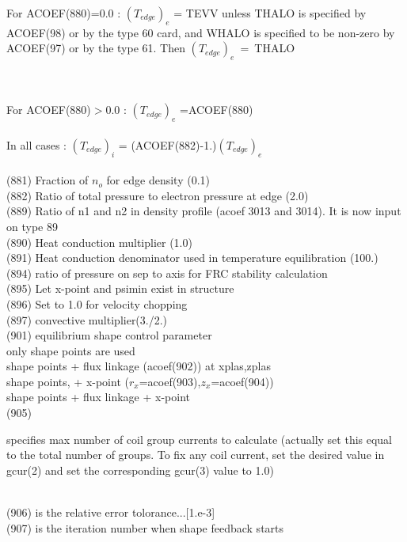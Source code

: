 \begin{tabbing}
 \>\parbox[t]{\width}{For ACOEF(880)=0.0  :  $\left({T_{edge}}\right)_e$ = TEVV  unless THALO  is  
specified  by ACOEF(98) or by the type 60  card, and WHALO is specified to be non-zero by ACOEF(97) 
or by the type 61.  Then $\left({T_{edge}}\right)_e$~=~THALO}  \\
  \\
  \>For ACOEF(880)$>$0.0 :  $\left({T_{edge}}\right)_e$ =ACOEF(880) \\
  \\
  \>In all cases  : $\left({T_{edge}}\right)_i$ = (ACOEF(882)-1.)$\left({T_{edge}}\right)_e$\\
 \\  
(881) \> Fraction of $n_o$ for edge density (0.1)\\
(882) \> Ratio of total pressure to electron pressure at edge (2.0)\\
(889) \> Ratio of n1 and n2 in density profile (acoef 3013 and 3014). It is now input on type 89 \\
(890) \> Heat conduction multiplier (1.0)\\
(891) \> Heat conduction denominator used in temperature equilibration (100.)\\
(894) \> ratio of pressure on sep to axis for FRC stability calculation \\
(895) \> Let x-point and psimin exist in structure \\
(896) \> Set to 1.0 for velocity chopping \\
(897) \> convective multiplier(3./2.) \\
(901) \> equilibrium shape control parameter  \\
        \> only shape points are used  \\
        \> shape points + flux linkage (acoef(902)) at xplas,zplas  \\
        \> shape points, + x-point ($r_x$=acoef(903),$z_x$=acoef(904))  \\
        \>  shape points + flux linkage + x-point   \\
(905) \>  \parbox[t]{\width}{ specifies max number of coil group currents to calculate
(actually set this equal to the total number of groups. To fix any
coil current, set the desired value in gcur(2) and set the corresponding
gcur(3) value to 1.0)} \\
(906) \> is the relative error tolorance...[1.e-3]  \\
(907) \> is the iteration number when shape feedback starts   \\

\end{tabbing}
